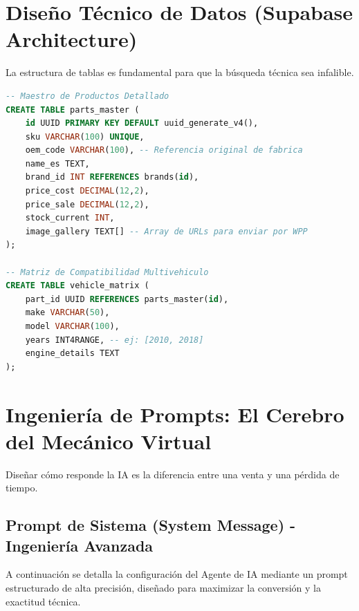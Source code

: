 \documentclass[12pt,a4paper]{article}
\begin{document}
\newpage

\section{Dise\~no Técnico de Datos (Supabase Architecture)}
La estructura de tablas es fundamental para que la búsqueda t\'ecnica sea infalible.

\begin{lstlisting}[language=SQL, caption=Esquema de Datos para Alta Disponibilidad y Compatibilidad]
-- Maestro de Productos Detallado
CREATE TABLE parts_master (
    id UUID PRIMARY KEY DEFAULT uuid_generate_v4(),
    sku VARCHAR(100) UNIQUE,
    oem_code VARCHAR(100), -- Referencia original de fabrica
    name_es TEXT,
    brand_id INT REFERENCES brands(id),
    price_cost DECIMAL(12,2),
    price_sale DECIMAL(12,2),
    stock_current INT,
    image_gallery TEXT[] -- Array de URLs para enviar por WPP
);

-- Matriz de Compatibilidad Multivehiculo
CREATE TABLE vehicle_matrix (
    part_id UUID REFERENCES parts_master(id),
    make VARCHAR(50), 
    model VARCHAR(100),
    years INT4RANGE, -- ej: [2010, 2018]
    engine_details TEXT
);
\end{lstlisting}

\newpage

\section{Ingenier\'ia de Prompts: El Cerebro del Mecánico Virtual}
Diseñar cómo responde la IA es la diferencia entre una venta y una pérdida de tiempo.

\subsection{Prompt de Sistema (System Message) - Ingenier\'ia Avanzada}
A continuación se detalla la configuración del Agente de IA mediante un prompt estructurado de alta precisi\'on, diseñado para maximizar la conversión y la exactitud t\'ecnica.
\end{document}
